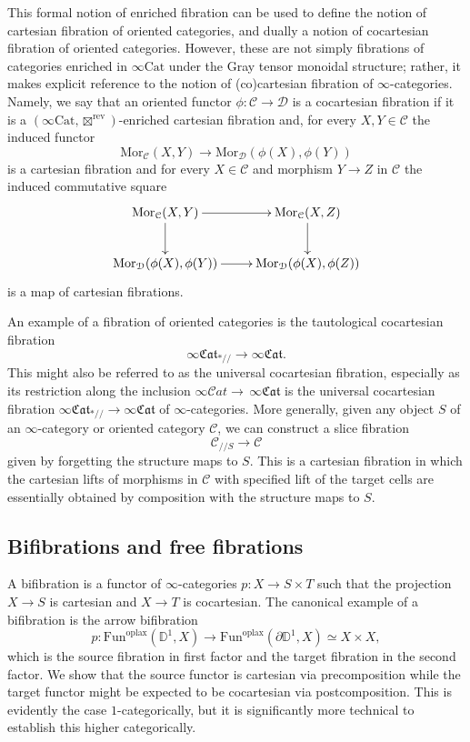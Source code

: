 \documentclass[10pt,oneside]{article}
\numberwithin{equation}{section} %
\numberwithin{figure}{section} %
\theoremstyle{plain}
\theoremstyle{definition}
\newcommand{\bD}{{\mathbb D}}
\newcommand{\mC}{{\mathcal C}}
\newcommand{\mD}{{\mathcal D}}
\newcommand{\rev}{{\mathrm{rev}}}
\newcommand{\Cat}{\mathrm{Cat}}
\newcommand{\Fun}{\mathrm{Fun}}
\newcommand{\oplax}{{\mathrm{oplax}}}
\newcommand{\Mor}{{\mathrm{Mor}}}
\newcommand{\scat}{\mathcal{C}\mathit{at}}
\newcommand{\fcat}{\mathfrak{Cat}}
\begin{document}
This formal notion of enriched fibration can be used to define the notion of cartesian fibration of oriented categories, and dually a notion of cocartesian fibration of oriented categories.
However, these are not simply fibrations of categories enriched in $\infty\Cat$ under the Gray tensor monoidal structure; rather, it makes explicit reference to the notion of (co)cartesian fibration of $\infty$-categories.
Namely, we say that an oriented functor $\phi: \mC \to \mD$ is a cocartesian fibration if it is a $(\infty\Cat, \boxtimes^\rev)$-enriched cartesian fibration and, for every $X,Y \in \mC$
the induced functor
$$\Mor_\mC(X,Y) \to \Mor_\mD(\phi(X),\phi(Y)) $$ is a cartesian fibration
and for every $X \in \mC$ and morphism $Y \to Z $ in $\mC$ the induced commutative square
$$\begin{xy}
\xymatrix{
\Mor_\mC(X,Y) \ar[d]^{} \ar[r]
& \Mor_\mC(X,Z) \ar[d]
\\ 
\Mor_\mD(\phi(X),\phi(Y)) \ar[r] & \Mor_\mD(\phi(X),\phi(Z))}
\end{xy}$$
is a map of cartesian fibrations. 


An example of a fibration of oriented categories is the tautological cocartesian fibration
\[
\infty\fcat_{\ast//}\to\infty\fcat.
\]
This might also be referred to as the universal cocartesian fibration, especially as its restriction along the inclusion $\infty\scat\to$$\,\infty\fcat$ is the universal cocartesian fibration $\infty\fcat_{\ast//}\to\infty\fcat$ of $\infty$-categories.
More generally, given any object $S$ of an $\infty$-category or oriented category $\mC$, we can construct a slice fibration
\[
\mC_{//S}\to\mC
\]
given by forgetting the structure maps to $S$.
This is a cartesian fibration in which the cartesian lifts of morphisms in $\mC$ with specified lift of the target cells are essentially obtained by composition with the structure maps to $S$.


\subsection{Bifibrations and free fibrations}
A bifibration is a functor of $\infty$-categories $p:X\to S\times T$ such that the projection $X\to S$ is cartesian and $X\to T$ is cocartesian.
The canonical example of a bifibration is the arrow bifibration
\[
p:\Fun^{\oplax}(\bD^1,X)\to\Fun^{\oplax}(\partial\bD^1,X)\simeq X\times X,
\]
which is the source fibration in first factor and the target fibration in the second factor.
We show that the source functor is cartesian via precomposition while the target functor might be expected to be cocartesian via postcomposition.
This is evidently the case $1$-categorically, but it is significantly more technical to establish this higher categorically.
\end{document}
